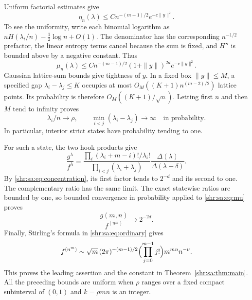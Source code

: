 \documentclass[11pt,letterpaper]{article}
\numberwithin{equation}{section}
\theoremstyle{definition}
\newcommand{\1}{\mathbf 1}
\newcommand{\D}{\Delta}
\begin{document}
Uniform factorial estimates give
\[
 \eta_n(\lambda)\le C n^{-(m-1)/2}e^{-c\|y\|^2}.
\]
To see the uniformity, write each binomial logarithm as
$nH(\lambda_i/n)-\tfrac12\log n+O(1)$. The denominator has the corresponding $n^{-1/2}$ prefactor, the linear entropy terms cancel because the sum is fixed, and $H''$ is bounded above by a negative constant. Thus
\begin{equation}\label{shr:sa:eq:envelope}
 \mu_n(\lambda)\le C n^{-(m-1)/2}
        (1+\|y\|)^{2d}e^{-c\|y\|^2}.
\end{equation}
Gaussian lattice-sum bounds give tightness of $y$. In a fixed box $\|y\|\le M$, a specified gap $\lambda_i-\lambda_j\le K$ occupies at most
$O_M((K+1)n^{(m-2)/2})$ lattice points. Its probability is therefore
$O_M((K+1)/\sqrt n)$. Letting first $n$ and then $M$ tend to infinity proves
\begin{equation}\label{shr:sa:eq:concentration}
 \lambda_i/n\longrightarrow\rho,\qquad
 \min_{i<j}(\lambda_i-\lambda_j)\longrightarrow\infty
 \quad\text{in probability.}
\end{equation}
In particular, interior strict states have probability tending to one.

For such a state, the two hook products give
\[
 \frac{g^\lambda}{f^\lambda}
 =\frac{\prod_i(\lambda_i+m-i)!/\lambda_i!}
        {\prod_{i<j}(\lambda_i+\lambda_j)}
       \frac{\D(\lambda)}{\D(\lambda+\delta)}.
\]
By \eqref{shr:sa:eq:concentration}, its first factor tends to $2^{-d}$ and its second to one. The complementary ratio has the same limit. The exact statewise ratios are bounded by one, so bounded convergence in probability applied to \eqref{shr:sa:eq:mu} proves
\begin{equation}\label{shr:sa:eq:comparison}
 \frac{g(m,n)}{f^{(n^m)}}\longrightarrow2^{-2d}.
\end{equation}
Finally, Stirling's formula in \eqref{shr:sa:eq:ordinary} gives
\[
 f^{(n^m)}\sim\sqrt m\,(2\pi)^{-(m-1)/2}
       \Bigl(\prod_{j=0}^{m-1}j!\Bigr)m^{mn}n^{-\nu}.
\]
This proves the leading assertion and the constant in Theorem~\ref{shr:sa:thm:main}. All the preceding bounds are uniform when $\rho$ ranges over a fixed compact subinterval of $(0,1)$ and $k=\rho mn$ is an integer.
\end{document}
